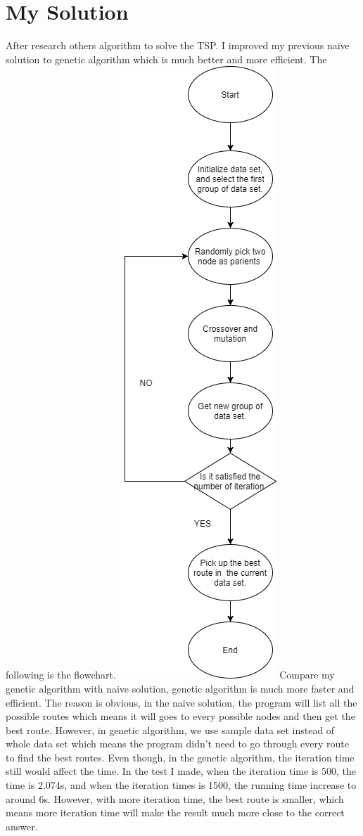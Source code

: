 \documentclass[a4paper,man,natbib]{apa6}
\begin{document}
\section{My Solution}
After research others algorithm to solve the TSP. I improved my previous naive solution to genetic algorithm which is much better and more efficient. The following is the flowchart.
\includegraphics[width=0.3\linewidth]{3} 
\newline 
Compare my genetic algorithm with naive solution, genetic algorithm is much more faster and efficient. The reason is obvious, in the naive solution, the program will list all the possible routes which means it will goes to every possible nodes  and then get the best route. However, in genetic algorithm, we use sample data set instead of whole data set which means the program didn't need to go through every route to find the best routes. Even though, in the genetic algorithm, the iteration time still would affect the time. In the test I made, when the iteration time is 500, the time is 2.074s, and when the iteration times is 1500, the running time increase to around 6s. However, with more iteration time, the best route is smaller, which means more iteration time will make the result much more close to the correct answer.
 
\end{document}
